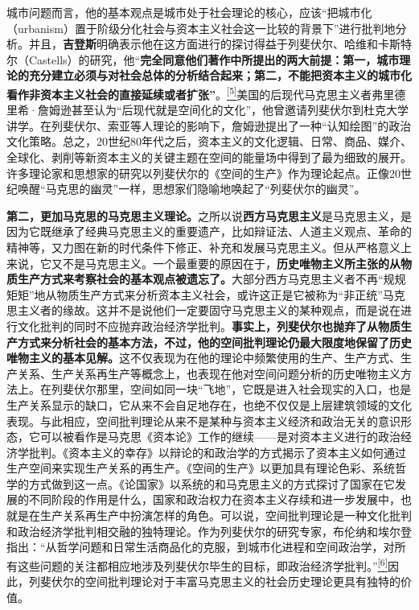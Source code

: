 \documentclass[UTF8, fontset = sourcesans, a4paper, oneside, zihao =
-4, scheme=chinese, no-math, space=true]{ctexbook}
\begin{document}
城市问题而言，他的基本观点是城市处于社会理论的核心，应该``把城市化（urbanism）置于阶级分化社会与资本主义社会这一比较的背景下''进行批判地分析。并且，\textbf{吉登斯}明确表示他在这方面进行的探讨得益于列斐伏尔、哈维和卡斯特尔（Castells）的研究，他``\textbf{完全同意他们著作中所提出的两大前提：第一，城市理论的充分建立必须与对社会总体的分析结合起来；第二，不能把资本主义的城市化看作非资本主义社会的直接延续或者扩张''}。\protect\hypertarget{part0010_split_001.htmlux5cux23w5}{}{}\protect\hyperlink{part0010_split_002.htmlux5cux23m5}{\textsuperscript{{[}5{]}}}美国的后现代马克思主义者弗里德里希·詹姆逊甚至认为``后现代就是空间化的文化''，他曾邀请列斐伏尔到杜克大学讲学。在列斐伏尔、索亚等人理论的影响下，詹姆逊提出了一种``认知绘图''的政治文化策略。总之，20世纪80年代之后，资本主义的文化逻辑、日常、商品、媒介、全球化、剥削等新资本主义的关键主题在空间的能量场中得到了最为细致的展开。许多理论家和思想家的研究以列斐伏尔的《空间的生产》作为理论起点。正像20世纪唤醒``马克思的幽灵''一样，思想家们隐喻地唤起了``列斐伏尔的幽灵''。

\textbf{第二，更加马克思的马克思主义理论。}之所以说\textbf{西方马克思主义}是马克思主义，是因为它既继承了经典马克思主义的重要遗产，比如辩证法、人道主义观点、革命的精神等，又力图在新的时代条件下修正、补充和发展马克思主义。但从严格意义上来说，它又不是马克思主义。一个最重要的原因在于，\textbf{历史唯物主义所主张的从物质生产方式来考察社会的基本观点被遗忘了。}大部分西方马克思主义者不再``规规矩矩''地从物质生产方式来分析资本主义社会，或许这正是它被称为``非正统''马克思主义者的缘故。这并不是说他们一定要固守马克思主义的某种观点，而是说在进行文化批判的同时不应抛弃政治经济学批判。\textbf{事实上，列斐伏尔也抛弃了从物质生产方式来分析社会的基本方法，不过，他的空间批判理论仍最大限度地保留了历史唯物主义的基本见解。}这不仅表现为在他的理论中频繁使用的生产、生产方式、生产关系、生产关系再生产等概念上，也表现在他对空间问题分析的历史唯物主义方法上。在列斐伏尔那里，空间如同一块``飞地''，它既是进入社会现实的入口，也是生产关系显示的缺口，它从来不会自足地存在，也绝不仅仅是上层建筑领域的文化表现。与此相应，空间批判理论从来不是某种与资本主义经济和政治无关的意识形态，它可以被看作是马克思《资本论》工作的继续------是对资本主义进行的政治经济学批判。《资本主义的幸存》以辩论的和政治学的方式揭示了资本主义如何通过生产空间来实现生产关系的再生产。《空间的生产》以更加具有理论色彩、系统哲学的方式做到这一点。《论国家》以系统的和马克思主义的方式探讨了国家在它发展的不同阶段的作用是什么，国家和政治权力在资本主义存续和进一步发展中，也就是在生产关系再生产中扮演怎样的角色。可以说，空间批判理论是一种文化批判和政治经济学批判相交融的独特理论。作为列斐伏尔的研究专家，布伦纳和埃尔登指出：``从哲学问题和日常生活商品化的克服，到城市化进程和空间政治学，对所有这些问题的关注都相应地涉及列斐伏尔毕生的目标，即政治经济学批判。''\protect\hypertarget{part0010_split_001.htmlux5cux23w6}{}{}\protect\hyperlink{part0010_split_002.htmlux5cux23m6}{\textsuperscript{{[}6{]}}}因此，列斐伏尔的空间批判理论对于丰富马克思主义的社会历史理论更具有独特的价值。
\end{document}
